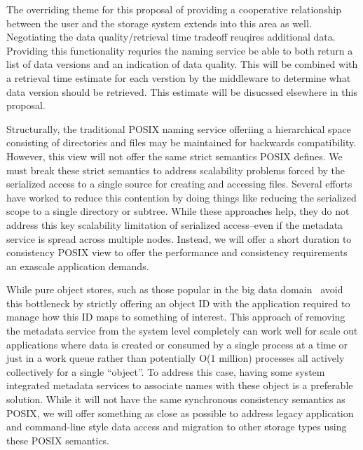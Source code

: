 The overriding theme for this proposal of providing a cooperative relationship
between the user and the storage system extends into this area as well.
Negotiating the data quality/retrieval time tradeoff reuqires additional data.
Providing this functionality requries the naming service be able to both return
a list of data versions and an indication of data quality. This will be
combined with a retrieval time estimate for each verstion by the middleware to
determine what data version should be retrieved.  This estimate will be
disucssed elsewhere in this proposal.

Structurally, the traditional POSIX naming service offeriing a hierarchical
space consisting of directories and files may be maintained for backwards
compatibility. However, this view will not offer the same strict semantics
POSIX defines. We must break these strict semantics to address scalability
problems forced by the serialized access to a single source for creating and
accessing files.  Several efforts~\cite{giga+,pvfs,others} have worked to
reduce this contention by doing things like reducing the serialized scope to a
single directory or subtree. While these approaches help, they do not address
this key scalability limitation of serialized access--even if the metadata
service is spread across multiple nodes. Instead, we will offer a
short duration to consistency POSIX view to offer the performance and
consistency requirements an exascale application demands.

While pure object stores, such as those popular in the big data
domain~\cite{memcached,others} avoid this bottleneck by strictly offering an
object ID with the application required to manage how this ID maps to something
of interest. This approach of removing the metadata service from the system
level completely can work well for scale out applications where data is created
or consumed by a single process at a time or just in a work queue rather than
potentially O(1 million) processes all actively collectively for a single
``object''. To address this case, having some system integrated metadata
services to associate names with these object is a preferable solution. While
it will not have the same synchronous consistency semantics as POSIX, we will
offer something as close as possible to address legacy application and
command-line style data access and migration to other storage types using these
POSIX semantics.

